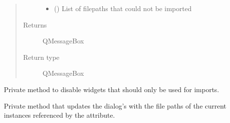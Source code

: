 \documentclass[letterpaper,10pt,english]{sphinxmanual}
\begin{document}
\begin{fulllineitems}
\begin{fulllineitems}
\begin{quote}
\begin{description}
\begin{itemize}
\item {} 
 () \textendash{} List of filepaths that could not be imported

\end{itemize}

\item[{Returns}] \leavevmode
QMessageBox

\item[{Return type}] \leavevmode
QMessageBox

\end{description}\end{quote}

\end{fulllineitems}


\begin{fulllineitems}
\label{\detokenize{polo.windows:polo.windows.run_importer.RunImporterDialog._disable_hwi_import_tools}}
Private method to disable widgets that should only be used for
 imports.

\end{fulllineitems}


\begin{fulllineitems}
\label{\detokenize{polo.windows:polo.windows.run_importer.RunImporterDialog._display_candidate_paths}}
Private method that updates the dialog’s  with the
file paths of the current {\hyperref[\detokenize{polo.windows:polo.windows.run_importer.ImportCandidate}]{}} instances referenced
by the   attribute.

\end{fulllineitems}



\end{fulllineitems}
\end{document}
